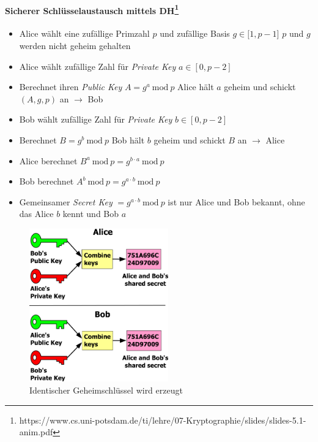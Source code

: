 \documentclass[10pt,a4paper]{article}
\begin{document}
\paragraph*{Sicherer Schlüsselaustausch mittels DH\footnote{https://www.cs.uni-potsdam.de/ti/lehre/07-Kryptographie/slides/slides-5.1-anim.pdf}}
\begin{itemize}[noitemsep,topsep=0pt,leftmargin=*]
    \item Alice wählt eine zufällige {\color{dunkelblau}Primzahl $p$} und zufällige {\color{dunkelblau}Basis $g\in[1,p-1$]}
    \subitem $p$ und $g$ werden nicht geheim gehalten
    \item Alice wählt zufällige Zahl für \textsl{Private Key} {\color{dunkelblau}$a\in[0,p-2]$}
    \item Berechnet ihren \textsl{Public Key} {\color{dunkelblau}$A = g^a\ \mathrm{mod}\ p$}
    \subitem Alice hält {\color{dunkelblau}$a$ geheim} und schickt $(A, g, p)$ an $\rightarrow$ Bob
    \item Bob wählt zufällige Zahl für \textsl{Private Key} {\color{dunkelblau}$b\in[0,p-2]$}
    \item Berechnet {\color{dunkelblau}$B = g^b\ \mathrm{mod}\ p$}
    \subitem Bob hält {\color{dunkelblau}$b$ geheim} und schickt $B$ an $\rightarrow$ Alice
    \item Alice berechnet {\color{dunkelblau}$B^a\ \mathrm{mod}\ p = g^{b\cdot a}\ \mathrm{mod}\ p$}
    \item Bob berechnet {\color{dunkelblau}$A^b\ \mathrm{mod}\ p = g^{a\cdot b}\ \mathrm{mod}\ p$}
    \item Gemeinsamer \textsl{Secret Key} {$= g^{a\cdot b}\ \mathrm{mod}\ p$} ist nur Alice und Bob bekannt, ohne das Alice $b$ kennt und Bob $a$
\end{itemize}
\begin{figure}[H]
    \begin{center}
    \includegraphics[width=6cm]{images/DH0.png}
    \caption{Identischer Geheimschlüssel wird erzeugt\cite{wiki}}
    \label{dh0}
    \end{center}
\end{figure}
\end{document}
